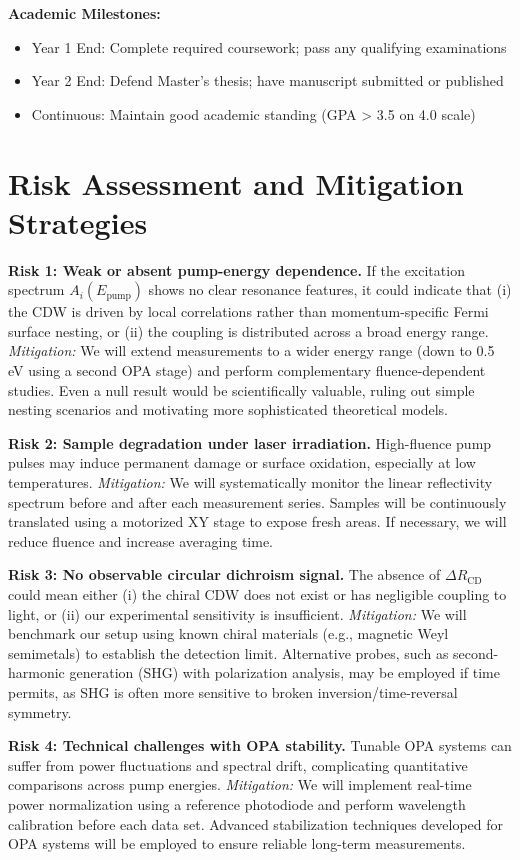 \documentclass[12pt,a4paper]{article}
\begin{document}
\textbf{Academic Milestones:}
\begin{itemize}
    \item Year 1 End: Complete required coursework; pass any qualifying examinations
    \item Year 2 End: Defend Master's thesis; have manuscript submitted or published
    \item Continuous: Maintain good academic standing (GPA > 3.5 on 4.0 scale)
\end{itemize}

\section{Risk Assessment and Mitigation Strategies}

\textbf{Risk 1: Weak or absent pump-energy dependence.} If the excitation spectrum $A_i(E_{\text{pump}})$ shows no clear resonance features, it could indicate that (i) the CDW is driven by local correlations rather than momentum-specific Fermi surface nesting, or (ii) the coupling is distributed across a broad energy range. \textit{Mitigation:} We will extend measurements to a wider energy range (down to 0.5 eV using a second OPA stage) and perform complementary fluence-dependent studies. Even a null result would be scientifically valuable, ruling out simple nesting scenarios and motivating more sophisticated theoretical models.

\textbf{Risk 2: Sample degradation under laser irradiation.} High-fluence pump pulses may induce permanent damage or surface oxidation, especially at low temperatures. \textit{Mitigation:} We will systematically monitor the linear reflectivity spectrum before and after each measurement series. Samples will be continuously translated using a motorized XY stage to expose fresh areas. If necessary, we will reduce fluence and increase averaging time.

\textbf{Risk 3: No observable circular dichroism signal.} The absence of $\Delta R_{\text{CD}}$ could mean either (i) the chiral CDW does not exist or has negligible coupling to light, or (ii) our experimental sensitivity is insufficient. \textit{Mitigation:} We will benchmark our setup using known chiral materials (e.g., magnetic Weyl semimetals) to establish the detection limit. Alternative probes, such as second-harmonic generation (SHG) with polarization analysis, may be employed if time permits, as SHG is often more sensitive to broken inversion/time-reversal symmetry.

\textbf{Risk 4: Technical challenges with OPA stability.} Tunable OPA systems can suffer from power fluctuations and spectral drift, complicating quantitative comparisons across pump energies. \textit{Mitigation:} We will implement real-time power normalization using a reference photodiode and perform wavelength calibration before each data set. Advanced stabilization techniques developed for OPA systems will be employed to ensure reliable long-term measurements.
\end{document}
